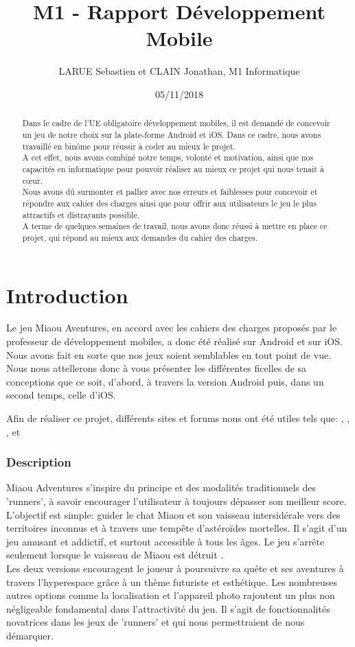 \documentclass{article}
\title{M1 - Rapport Développement Mobile}
\author{LARUE Sebastien et CLAIN Jonathan, M1 Informatique}
\date{05/11/2018}
\begin{document}
\maketitle
\begin{abstract}
\Large
Dans le cadre de l'UE obligatoire développement mobiles, il est demandé de concevoir un jeu de notre choix sur la plate-forme Android et iOS. Dans ce cadre, nous avons travaillé en binôme pour réussir à coder au mieux le projet.\\
A cet effet, nous avons combiné notre temps, volonté et motivation, ainsi que nos capacités en informatique pour pouvoir réaliser au mieux ce projet qui nous tenait à cœur.\\
Nous avons dû surmonter et pallier avec nos erreurs et faiblesses pour concevoir et répondre aux cahier des charges ainsi que pour offrir aux utilisateurs le jeu le plus attractifs et distrayants possible.\\
A terme de quelques semaines de travail, nous avons donc réussi à mettre en place ce projet, qui répond au mieux aux demandes du cahier des charges.\\

\end{abstract}

\newpage
\part*{Introduction}
\Large
Le jeu Miaou Aventures, en accord avec les cahiers des charges proposés par le professeur de développement mobiles, a donc été réalisé sur Android et sur iOS. Nous avons fait en sorte que nos jeux soient semblables en tout point de vue.\\
Nous nous attellerons donc à vous présenter les différentes ficelles de sa conceptions que ce soit, d’abord, à travers la version Android puis, dans un second temps, celle d’iOS.

Afin de réaliser ce projet, différents sites et forums nous ont été utiles tels que: \cite{AndroidStudio}, \cite{Apple}, \cite{OpenClassroom}, \cite{RayWenderlich} et \cite{Youtube}

\section{Description}
Miaou Adventures s'inspire du principe et des modalités traditionnels des 'runners', à savoir encourager l'utilisateur à toujours dépasser son meilleur score. L'objectif est simple: guider le chat Miaou et son vaisseau intersidérale vers des territoires inconnus et à travers une tempête d'astéroïdes mortelles. Il s'agit d'un jeu amusant et addictif, et surtout accessible à tous les âges. Le jeu s'arrête seulement lorsque le vaisseau de Miaou est détruit .\\
Les deux versions encouragent le joueur à poursuivre sa quête et ses aventures à travers l'hyperespace grâce à un thème futuriste et esthétique. Les nombreuses autres options comme la localisation et l'appareil photo rajoutent un plus non négligeable fondamental dans l'attractivité du jeu. 
Il s'agit de fonctionnalités novatrices dans les jeux de 'runners' et qui nous permettraient de nous démarquer. 
\end{document}
